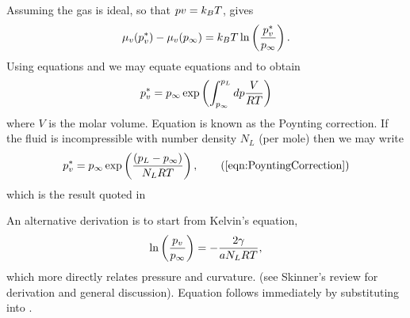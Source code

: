 Assuming the gas is ideal, so that $ p v = k_B T$,  gives
\begin{align}
  \mu_v(p_v^\ast) - \mu_v(p_{\infty}) = k_B T \ln \left( \frac{p_v^\ast}{p_\infty} \right).
\end{align}
Using equations  and  we may
equate equations  and  to obtain
\begin{align}
  p_v^\ast = p_\infty \exp \left( \int_{p_\infty}^{p_L} dp\frac{V}{RT}   \right)\label{eqn:PoyntingCorrectionFormal}
\end{align}
where $V$ is the molar volume.
Equation  is known as the Poynting correction.
If the fluid is incompressible with number density $N_L$  (per mole) then we may write
\begin{align}
  p_v^\ast = p_\infty \exp \lr{ \frac{\lr{p_L -p_\infty} }{N_L RT}  },\tag{\ref{eqn:PoyntingCorrection}}
\end{align}
which is the result quoted in 

An alternative derivation is to start  from Kelvin's equation,
\begin{align}
\ln\left( \frac{p_v}{p_\infty} \right) = - \frac{2\gamma }{a N_L RT}, \label{eqn:KelvinRelation}
\end{align}
which more directly relates pressure and curvature. (see Skinner's review\cite{Skinner1972} for derivation and general discussion).
Equation  follows immediately by substituting   into .





